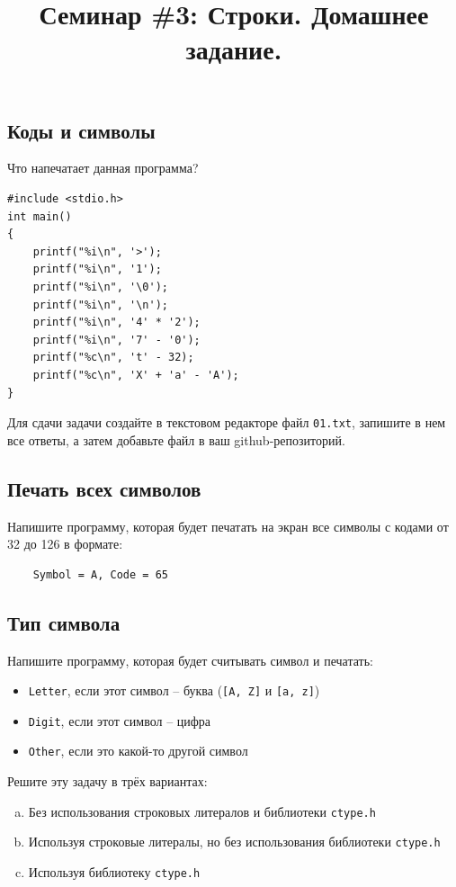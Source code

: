 \documentclass{article}
\begin{document}
\title{Семинар \#3: Строки. Домашнее задание.\vspace{-5ex}}\date{}\maketitle

\subsection{Коды и символы}
Что напечатает данная программа?
\begin{lstlisting}
#include <stdio.h>
int main()
{
	printf("%i\n", '>');
	printf("%i\n", '1');
	printf("%i\n", '\0');
	printf("%i\n", '\n');
	printf("%i\n", '4' * '2');
	printf("%i\n", '7' - '0');
	printf("%c\n", 't' - 32);
	printf("%c\n", 'X' + 'a' - 'A');
}
\end{lstlisting}
Для сдачи задачи создайте в текстовом редакторе файл \texttt{01.txt}, запишите в нем все ответы, а затем добавьте файл в ваш github-репозиторий.

\subsection{Печать всех символов}
Напишите программу, которая будет печатать на экран все символы с кодами от 32 до 126 в формате:
\begin{verbatim}
    Symbol = A, Code = 65
\end{verbatim}
                

\subsection{Тип символа}
Напишите программу, которая будет считывать символ и печатать:
\begin{itemize}
\item \texttt{Letter}, если этот символ – буква (\texttt{[A, Z]} и \texttt{[a, z]})
\item \texttt{Digit}, если этот символ – цифра
\item \texttt{Other}, если это какой-то другой символ
\end{itemize}

Решите эту задачу в трёх вариантах:
\begin{enumerate}[(a)]
\item Без использования строковых литералов и библиотеки \texttt{ctype.h}
\item Используя строковые литералы, но без использования библиотеки \texttt{ctype.h}
\item Используя библиотеку \texttt{ctype.h}
\end{enumerate}
\end{document}
